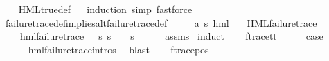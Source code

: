 \begin{isabellebody}
\ \ \isamarkupfalse%
\ HML{\isacharunderscore}{\kern0pt}true{\isacharunderscore}{\kern0pt}def\isanewline
\ \ \isamarkupfalse%
{\isacharparenleft}{\kern0pt}induction{\isacharcomma}{\kern0pt}\ simp{\isacharcomma}{\kern0pt}\ fastforce{\isacharparenright}{\kern0pt}\isanewline
\isanewline
{}\isamarkupfalse%
\ failure{\isacharunderscore}{\kern0pt}trace{\isacharunderscore}{\kern0pt}def{\isacharunderscore}{\kern0pt}implies{\isacharunderscore}{\kern0pt}alt{\isacharunderscore}{\kern0pt}failure{\isacharunderscore}{\kern0pt}trace{\isacharunderscore}{\kern0pt}def{\isacharcolon}{\kern0pt}\isanewline
\ \ \ {\isasymphi}\ {\isacharcolon}{\kern0pt}{\isacharcolon}{\kern0pt}\ {\isachardoublequoteopen}{\isacharparenleft}{\kern0pt}{\isacharprime}{\kern0pt}a{\isacharcomma}{\kern0pt}\ {\isacharprime}{\kern0pt}s{\isacharparenright}{\kern0pt}\ hml{\isachardoublequoteclose}\isanewline
\ \ \ {\isachardoublequoteopen}HML{\isacharunderscore}{\kern0pt}failure{\isacharunderscore}{\kern0pt}trace\ {\isasymphi}{\isachardoublequoteclose}\isanewline
\ \ \ {\isachardoublequoteopen}{\isasymexists}{\isasympsi}{\isachardot}{\kern0pt}\ hml{\isacharunderscore}{\kern0pt}failure{\isacharunderscore}{\kern0pt}trace\ {\isasympsi}\ {\isasymand}\ {\isacharparenleft}{\kern0pt}{\isasymforall}s{\isachardot}{\kern0pt}\ {\isacharparenleft}{\kern0pt}s\ {\isasymTurnstile}\ {\isasymphi}{\isacharparenright}{\kern0pt}\ {\isasymlongleftrightarrow}\ {\isacharparenleft}{\kern0pt}s\ {\isasymTurnstile}\ {\isasympsi}{\isacharparenright}{\kern0pt}{\isacharparenright}{\kern0pt}{\isachardoublequoteclose}\isanewline
\ \ \isamarkupfalse%
\ assms\ \isamarkupfalse%
{\isacharparenleft}{\kern0pt}induct{\isacharparenright}{\kern0pt}\isanewline
\ \ \isamarkupfalse%
\ f{\isacharunderscore}{\kern0pt}trace{\isacharunderscore}{\kern0pt}tt\isanewline
\ \ \isamarkupfalse%
\ \isamarkupfalse%
\ {\isacharquery}{\kern0pt}case\ \isanewline
\ \ \ \ \isamarkupfalse%
\ hml{\isacharunderscore}{\kern0pt}failure{\isacharunderscore}{\kern0pt}trace{\isachardot}{\kern0pt}intros{\isacharparenleft}{\kern0pt}{}{\isacharparenright}{\kern0pt}\ \isamarkupfalse%
\ blast\isanewline
{}\isamarkupfalse%
\isanewline
\ \ \isamarkupfalse%
\ {\isacharparenleft}{\kern0pt}f{\isacharunderscore}{\kern0pt}trace{\isacharunderscore}{\kern0pt}pos\ {\isasymphi}\ {\isasymalpha}{\isacharparenright}{\kern0pt}\isanewline

\end{isabellebody}
